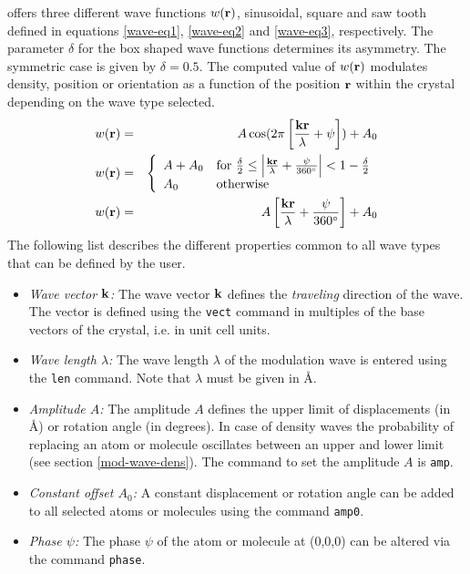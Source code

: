 \Discus offers three different wave functions $w({\bf r})$,
sinusoidal, square and saw tooth defined in equations
\ref{wave-eq1}, \ref{wave-eq2} and \ref{wave-eq3}, respectively. The
parameter $\delta$ for the box shaped wave functions determines its
asymmetry. The symmetric case is given by $\delta = 0.5$. The
computed value of $w({\bf r})$ modulates density, position or
orientation as a function of the position ${\bf r}$ within the
crystal depending on the wave type selected.
%
\begin{eqnarray}
    w({\bf r}) & = & A \cos (2\pi\left [
                    \frac{{\bf kr}}{\lambda}+\psi\right ]) + A_{0}
    \label{wave-eq1}  \\
    w({\bf r}) & = & \left \{
       \begin{array}{ll}
       A+A_{0} & \mbox{for $\frac{\delta}{2} \leq
                            \left | \frac{\bf kr}{\lambda}+
                                \frac{\psi}{360^\circ} \right | <
                            1 - \frac{\delta}{2}$}\\
       A_{0}   & \mbox{otherwise}\\
       \end{array} \right.
    \label{wave-eq2}  \\
    w({\bf r}) & = & A \left [\frac{{\bf kr}}{\lambda}+
                                  \frac{\psi}{360^\circ} \right ] + A_{0}
    \label{wave-eq3}
\end{eqnarray}
%
The following list describes the different properties common to all
wave types that can be defined by the user.
%
\begin{itemize}
    \item  {\it Wave vector ${\bf k}$:}
    The wave vector ${\bf k}$ defines the {\it traveling} direction of the wave.
    The vector is defined using the {\tt vect} command in multiples of the base
    vectors of the crystal, i.e.  in unit cell units.

    \item  {\it Wave length $\lambda$:}
    The wave length $\lambda$ of the modulation wave is entered using
    the {\tt len} command. Note that $\lambda$ must be given in \AA.

    \item  {\it Amplitude $A$:}
    The amplitude $A$ defines the upper limit of displacements (in \AA) or
    rotation angle (in degrees). In case of density waves the probability
    of replacing an atom or molecule oscillates between an upper and
    lower limit (see section \ref{mod-wave-dens}). The command to set the
    amplitude $A$ is {\tt amp}.

    \item  {\it Constant offset $A_{0}$:}
    A constant displacement or rotation angle can be added to all
    selected atoms or molecules using the command {\tt amp0}.

    \item  {\it Phase $\psi$:}
    The phase $\psi$ of the atom or molecule at (0,0,0) can be altered via the
    command {\tt phase}.
\end{itemize}
